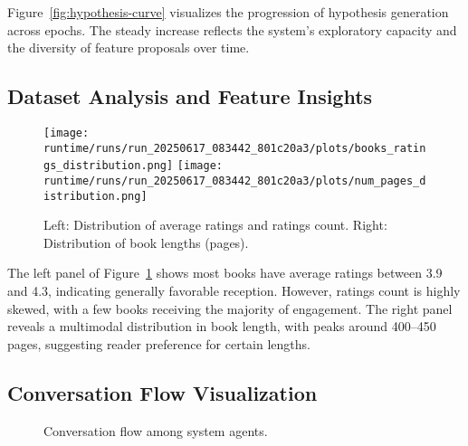 Figure~\ref{fig:hypothesis-curve} visualizes the progression of hypothesis generation across epochs. The steady increase reflects the system's exploratory capacity and the diversity of feature proposals over time.

\subsection{Dataset Analysis and Feature Insights}

\begin{figure}[h]
    \centering
    \texttt{[image: runtime/runs/run\_20250617\_083442\_801c20a3/plots/books\_ratings\_distribution.png]}
    \texttt{[image: runtime/runs/run\_20250617\_083442\_801c20a3/plots/num\_pages\_distribution.png]}
    \caption{Left: Distribution of average ratings and ratings count. Right: Distribution of book lengths (pages).}
    \label{fig:dataset-distributions}
\end{figure}

The left panel of Figure~\ref{fig:dataset-distributions} shows most books have average ratings between 3.9 and 4.3, indicating generally favorable reception. However, ratings count is highly skewed, with a few books receiving the majority of engagement. The right panel reveals a multimodal distribution in book length, with peaks around 400--450 pages, suggesting reader preference for certain lengths.

\subsection{Conversation Flow Visualization}

\begin{figure}[h]
\centering
{}
\caption{Conversation flow among system agents.}
\label{fig:conversation-flow}
\end{figure}

